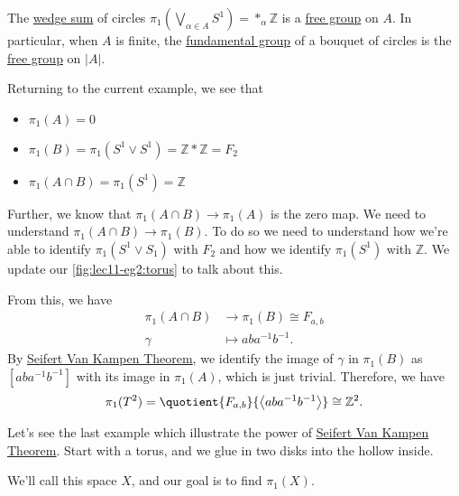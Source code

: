 \begin{explanation}
	\begin{corollary}
		The \hyperref[CW-complex-wedge-sum]{wedge sum} of circles \(\pi _1(\bigvee_{\alpha \in A}S^1) = \ast_\alpha \mathbb{Z} \) is a \hyperref[def:free-group]{free group} on \(A\).
		In particular, when \(A\) is finite, the \hyperref[def:fundamental-group]{fundamental group} of a bouquet of circles is the \hyperref[def:free-group]{free group}
		on \(\left\vert A \right\vert \).
	\end{corollary}

	Returning to the current example, we see that
	\begin{itemize}
		\item \(\pi _1(A) = 0\)
		\item \(\pi _1(B) = \pi _1(S^1\vee S^1) = \mathbb{Z} \ast \mathbb{Z}  = F_2\)
		\item \(\pi _1(A\cap B) = \pi _1(S^1) = \mathbb{Z} \)
	\end{itemize}

	Further, we know that \(\pi _1(A\cap B)\to \pi _1(A)\) is the zero map. We need to understand \(\pi_1(A\cap B)\to \pi _1(B)\). To do so we
	need to understand how we're able to identify \(\pi _1(S^1\vee S_1)\) with \(F_2\) and how we identify \(\pi _1(S^1)\) with \(\mathbb{Z} \).
	We update our \autoref{fig:lec11-eg2:torus} to talk about this.
	\begin{figure}[H]
		\centering
		\label{fig:lec11-eg2:torus-ver2}
	\end{figure}
	From this, we have
	\[
		\begin{split}
			\pi _1(A\cap B) & \to \pi _1(B)\cong F_{a, b} \\
			\gamma          & \mapsto aba^{-1} b^{-1}.
		\end{split}
	\]
	By \hyperref[thm:Seifert-Van-Kampen-Theorem]{Seifert Van Kampen Theorem}, we identify the image of \(\gamma \) in \(\pi _1(B)\) as \([aba^{-1} b^{-1} ]\) with
	its image in \(\pi _1(A)\), which is just trivial. Therefore, we have
	\[
		\pi _1(T^2) = \quotient{F_{a, b}}{\left< aba^{-1} b^{-1}  \right> } \cong \mathbb{Z} ^2.
	\]
\end{explanation}
\begin{eg}
	Let's see the last example which illustrate the power of \hyperref[thm:Seifert-Van-Kampen-Theorem]{Seifert Van Kampen Theorem}. Start with a torus, and
	we glue in two disks into the hollow inside.
	\begin{figure}[H]
		\centering
		\label{fig:lec11:eg-3:1}
	\end{figure}
	We'll call this space \(X\), and our goal is to find \(\pi_1(X)\).
\end{eg}
